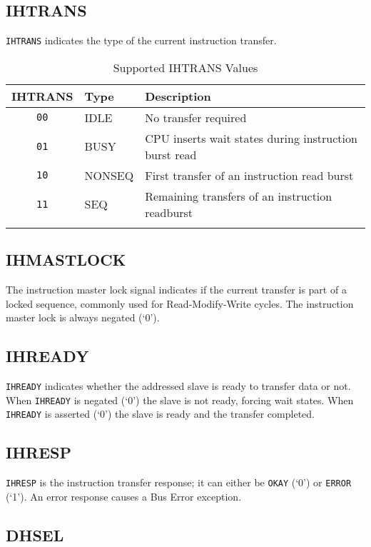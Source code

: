 \subsection{IHTRANS}\label{ihtrans}

\texttt{IHTRANS} indicates the type of the current instruction transfer.

\begin{longtable}[]{@{}cll@{}}
\toprule
IHTRANS & Type & Description\tabularnewline
\midrule
\endhead
\texttt{00} & IDLE   & No transfer required\tabularnewline
\texttt{01} & BUSY   & CPU inserts wait states during instruction burst read\tabularnewline
\texttt{10} & NONSEQ & First transfer of an instruction read burst\tabularnewline
\texttt{11} & SEQ    & Remaining transfers of an instruction readburst\tabularnewline
\bottomrule
\caption{Supported IHTRANS Values}
\label{tab:ihtrans-values}
\end{longtable}

\subsection{IHMASTLOCK}\label{ihmastlock}

The instruction master lock signal indicates if the current transfer is
part of a locked sequence, commonly used for Read-Modify-Write cycles.
The instruction master lock is always negated (`0').

\subsection{IHREADY}\label{ihready}

\texttt{IHREADY} indicates whether the addressed slave is ready to transfer data
or not. When \texttt{IHREADY} is negated (`0') the slave is not ready, forcing
wait states. When \texttt{IHREADY} is asserted (`0') the slave is ready and the
transfer completed.

\subsection{IHRESP}\label{ihresp}

\texttt{IHRESP} is the instruction transfer response; it can either be \texttt{OKAY} (`0')
or \texttt{ERROR} (`1'). An error response causes a Bus Error exception.

\subsection{DHSEL}\label{dhsel}

